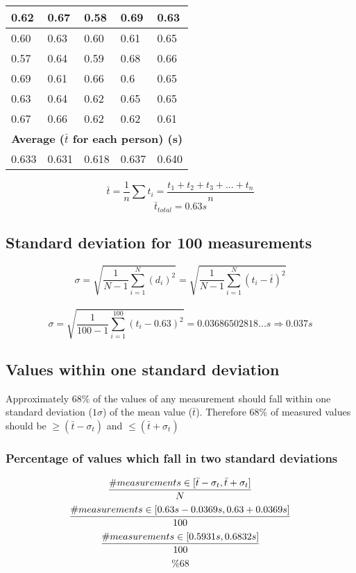 \documentclass[11pt, letterpaper, includehead]{article}
\begin{document}
\begin{center}
\begin{tabular}{|  m{2cm} | m{2cm} | m{2cm} | m{2cm} | m{2cm} | }
    0.62          & 0.67           & 0.58         & 0.69           & 0.63          \\
    \hline
    0.60          & 0.63           & 0.60         & 0.61           & 0.65          \\
    \hline
    0.57          & 0.64           & 0.59         & 0.68           & 0.66          \\
    \hline
    0.69          & 0.61           & 0.66         & 0.6            & 0.65          \\
    \hline
    0.63          & 0.64           & 0.62         & 0.65           & 0.65          \\
    \hline
    0.67          & 0.66           & 0.62         & 0.62           & 0.61          \\
    \hline\hline
    \multicolumn{5}{|c|}{\textbf{Average ($\bar{t}$ for each person) (s)}} \\
    \hline
    0.633         & 0.631          & 0.618        & 0.637          & 0.640         \\
    \hline
  \end{tabular}
\end{center}
$$\bar{t} = \frac{1}{n}\sum t_i = \frac{t_1 + t_2 + t_3 + ... + t_n}{n}$$
$$\bar{t}_{total} = \boxed{0.63s}$$

\subsection{Standard deviation for 100 measurements} %
$$\sigma = \sqrt{\frac{1}{N - 1}\sum_{i = 1}^{N} (d_i)^2} = \sqrt{\frac{1}{N - 1}\sum_{i = 1}^{N} (t_i - \bar{t})^2}$$\\
$$\sigma = \sqrt{\frac{1}{100 - 1}\sum_{i = 1}^{100}(t_i - 0.63)^2} = 0.03686502818...s \Rightarrow \boxed{0.037s}$$

\subsection{Values within one standard deviation} %
Approximately $68\%$ of the values of any measurement should fall within one
standard deviation ($1 \sigma$) of the mean value ($\bar{t}$). Therefore $68\%$ of measured
values should be $\geq (\bar{t} - \sigma_t)$ and $\leq (\bar{t} + \sigma_t)$

\subsubsection{Percentage of values which fall in two standard deviations} %
$$\frac{\# measurements \in [\bar{t} - \sigma_t, \bar{t} + \sigma_t]}{N} \\$$
$$\frac{\# measurements \in [0.63s - 0.0369s, 0.63 + 0.0369s]}{100} \\$$
$$\frac{\# measurements \in [0.5931s, 0.6832s]}{100} \\$$
$$\boxed{\%68}$$ %
\end{document}
